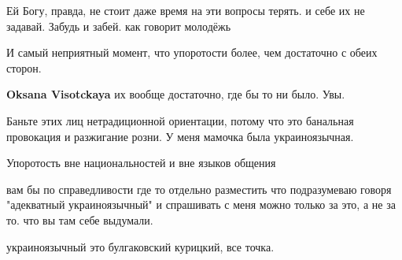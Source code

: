 \begin{itemize}
Ей Богу, правда, не стоит даже время на эти вопросы терять. и себе их не
задавай. Забудь и забей. как говорит молодёжь


 
И самый неприятный момент, что упоротости более, чем достаточно с обеих сторон.

\begin{itemize}
 
\textbf{Oksana Visotckaya} их вообще достаточно, где бы то ни было. Увы.
\end{itemize}

 
Баньте этих лиц нетрадиционной ориентации, потому что это банальная провокация и разжигание розни. У меня мамочка была украиноязычная.

 
Упоротость вне национальностей и вне языков общения

 

вам бы по справедливости где то отдельно разместить что подразумеваю говоря
"адекватный украиноязычный" и спрашивать с меня можно только за это, а не за
то. что вы там себе выдумали.

украиноязычный это булгаковский курицкий, все точка.


\end{itemize}
